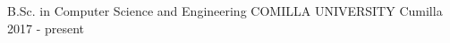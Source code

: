 

\begin{cventries}

  \cventry
    {B.Sc. in Computer Science and Engineering} %
    {COMILLA UNIVERSITY} %
    {Cumilla} %
    {2017 - present} %
    {
    }
\vspace{-0.7cm}
\end{cventries}
